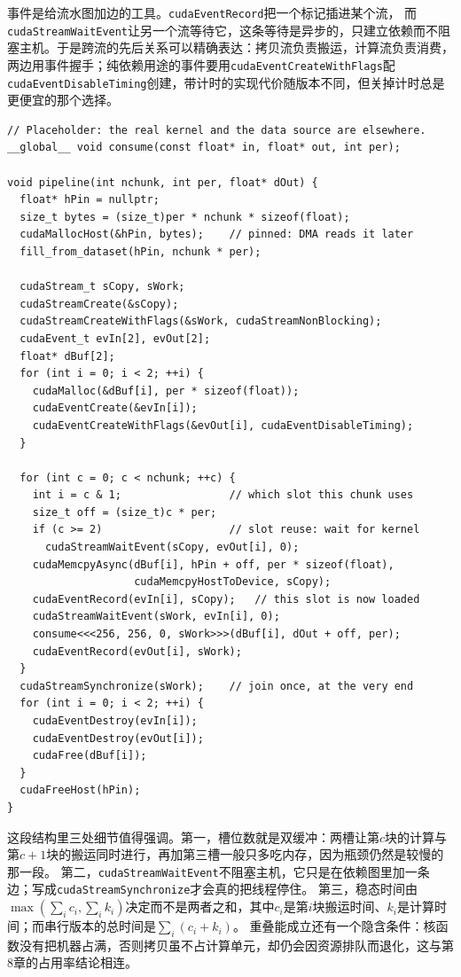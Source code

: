 \documentclass[12pt,a4paper,fontset=fandol]{ctexbook}
\newcommand{\Tp}[1]{\texttt{#1}}
\newcommand{\Bk}{\allowbreak}
\begin{document}
事件是给流水图加边的工具。\Tp{cuda{\Bk}Event{\Bk}Record}把一个标记插进某个流，
而\Tp{cuda{\Bk}Stream{\Bk}Wait{\Bk}Event}让另一个流等待它，这条等待是异步的，只建立依赖而不阻塞主机。于是跨流的先后关系可以精确表达：拷贝流负责搬运，计算流负责消费，两边用事件握手；纯依赖用途的事件要用\Tp{cuda{\Bk}Event{\Bk}Create{\Bk}With{\Bk}Flags}配\Tp{cuda{\Bk}Event{\Bk}Disable{\Bk}Timing}创建，带计时的实现代价随版本不同，但关掉计时总是更便宜的那个选择。

\begin{lstlisting}[style=cudastyle,caption={pinned源加双流分块：拷贝与计算重叠}]
// Placeholder: the real kernel and the data source are elsewhere.
__global__ void consume(const float* in, float* out, int per);

void pipeline(int nchunk, int per, float* dOut) {
  float* hPin = nullptr;
  size_t bytes = (size_t)per * nchunk * sizeof(float);
  cudaMallocHost(&hPin, bytes);    // pinned: DMA reads it later
  fill_from_dataset(hPin, nchunk * per);

  cudaStream_t sCopy, sWork;
  cudaStreamCreate(&sCopy);
  cudaStreamCreateWithFlags(&sWork, cudaStreamNonBlocking);
  cudaEvent_t evIn[2], evOut[2];
  float* dBuf[2];
  for (int i = 0; i < 2; ++i) {
    cudaMalloc(&dBuf[i], per * sizeof(float));
    cudaEventCreate(&evIn[i]);
    cudaEventCreateWithFlags(&evOut[i], cudaEventDisableTiming);
  }

  for (int c = 0; c < nchunk; ++c) {
    int i = c & 1;                 // which slot this chunk uses
    size_t off = (size_t)c * per;
    if (c >= 2)                    // slot reuse: wait for kernel
      cudaStreamWaitEvent(sCopy, evOut[i], 0);
    cudaMemcpyAsync(dBuf[i], hPin + off, per * sizeof(float),
                    cudaMemcpyHostToDevice, sCopy);
    cudaEventRecord(evIn[i], sCopy);   // this slot is now loaded
    cudaStreamWaitEvent(sWork, evIn[i], 0);
    consume<<<256, 256, 0, sWork>>>(dBuf[i], dOut + off, per);
    cudaEventRecord(evOut[i], sWork);
  }
  cudaStreamSynchronize(sWork);    // join once, at the very end
  for (int i = 0; i < 2; ++i) {
    cudaEventDestroy(evIn[i]);
    cudaEventDestroy(evOut[i]);
    cudaFree(dBuf[i]);
  }
  cudaFreeHost(hPin);
}
\end{lstlisting}

这段结构里三处细节值得强调。第一，槽位数就是双缓冲：两槽让第$c$块的计算与第$c+1$块的搬运同时进行，再加第三槽一般只多吃内存，因为瓶颈仍然是较慢的那一段。
第二，\Tp{cudaStreamWaitEvent}不阻塞主机，它只是在依赖图里加一条边；写成\Tp{cudaStreamSynchronize}才会真的把线程停住。
第三，稳态时间由$\max(\sum_i c_i,\sum_i k_i)$决定而不是两者之和，其中$c_i$是第$i$块搬运时间、$k_i$是计算时间；而串行版本的总时间是$\sum_i (c_i+k_i)$。
重叠能成立还有一个隐含条件：核函数没有把机器占满，否则拷贝虽不占计算单元，却仍会因资源排队而退化，这与第8章的占用率结论相连。
\end{document}
